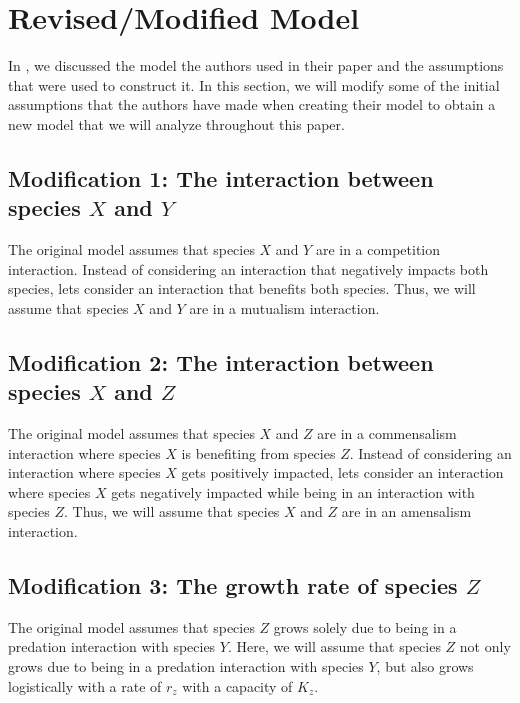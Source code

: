\chapter{Revised/Modified Model}\label{chapter:modified_model}
In , we discussed the model the authors used in their paper and the assumptions that were used to construct it. In this section, we will modify some of the initial assumptions that the authors have made when creating their model to obtain a new model that we will analyze throughout this paper.

\section{Modification 1: The interaction between species $X$ and $Y$}\label{sec:modification_1}
The original model assumes that species $X$ and $Y$ are in a competition interaction. Instead of considering an interaction that negatively impacts both species, lets consider an interaction that benefits both species. Thus, we will assume that species $X$ and $Y$ are in a mutualism interaction.

\section{Modification 2: The interaction between species $X$ and $Z$}\label{sec:modification_2}
The original model assumes that species $X$ and $Z$ are in a commensalism interaction where species $X$ is benefiting from species $Z$. Instead of considering an interaction where species $X$ gets positively impacted, lets consider an interaction where species $X$ gets negatively impacted while being in an interaction with species $Z$. Thus, we will assume that species $X$ and $Z$ are in an amensalism interaction.

\section{Modification 3: The growth rate of species $Z$}\label{sec:modification_3}
The original model assumes that species $Z$ grows solely due to being in a predation interaction with species $Y$. Here, we will assume that species $Z$ not only grows due to being in a predation interaction with species $Y$, but also grows logistically with a rate of $r_z$ with a capacity of $K_z$.

